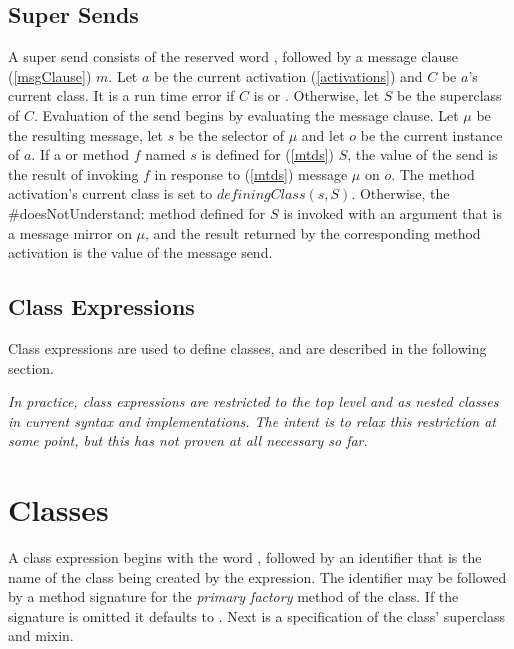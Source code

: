 \documentclass{article}
\newcommand{\code}[1]{{\sf #1}}
\begin{document}
\subsection{Super Sends}
\label{super}


A super send consists of the reserved word \SUPER, followed by a message clause  (\ref{msgClause}) $m$.  Let $a$ be the current activation (\ref{activations}) and $C$ be $a$'s current class. 
 It is a run time error if $C$ is  or .
Otherwise, let $S$ be the superclass of $C$. Evaluation of the send begins by evaluating  the message clause. Let  $\mu$ be the resulting message, let $s$ be the selector of $\mu$ and let $o$ be the current instance of $a$.  If a \PUBLIC{ } or \PROTECTED{ } method $f$ named $s$ is defined for (\ref{mtds}) $S$,  the value of the send is the result of  invoking $f$  in response to (\ref{mtds})  message $\mu$ on $o$. The method activation's current class is set to  $definingClass(s, S)$. Otherwise, the \code{\#doesNotUnderstand:} method  defined for  $S$ 
 is invoked
with an argument that is a message mirror on $\mu$, and the result  returned by the corresponding method activation is the value of the message send.  


\subsection{Class Expressions}
\label{classExpressions}

Class expressions are used to define classes, and are described in the following section.

{\em In practice, class expressions are restricted to the top level and as nested classes in current syntax and implementations.  The intent is to relax this restriction at some point, but this has not proven at all necessary so far. 
 }
 
 
 \section{Classes}
 \label{classes}
  
A class expression begins with the word \CLASS{}, followed by an identifier that is the name of the class being created by the expression.  The identifier may be followed by a method signature for the {\em primary factory} method of the class.  If the signature is omitted it defaults to .
Next is a specification of  the class' superclass and mixin.
\end{document}
